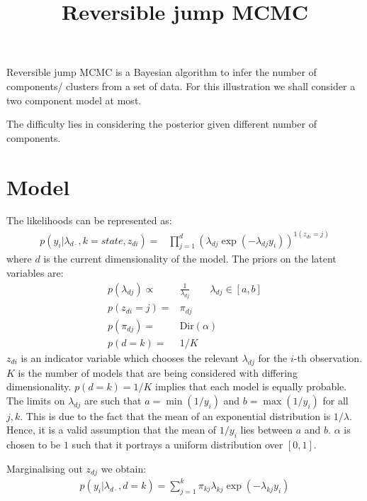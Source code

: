 \documentclass{article}
\title{Reversible jump MCMC}
\date{}
\begin{document}
\maketitle




Reversible jump MCMC is a Bayesian algorithm to infer the number of components/ clusters from a set of data. For this illustration we shall consider a two component model at most.

The difficulty lies in considering the posterior given different number of components.

\section{Model}
The likelihoods can be represented as:
\begin{align}
p(y_i|\lambda_{d\cdot},k=state,z_{di})=&\prod_{j=1}^{d} (\lambda_{dj}\exp(-\lambda_{dj}y_i))^{1(z_{di}=j)}
\end{align}
where $d$ is the current dimensionality of the model. The priors on the latent variables are:
\begin{align}
p(\lambda_{dj})\propto & \frac{1}{\lambda_{dj}}\qquad \lambda_{dj}\in[a,b]\\
p(z_{di}=j)=&\pi_{dj}\\
p(\pi_{dj}) = & \text{Dir}(\alpha)\\
p(d=k)= & 1/K
\end{align}
$z_{di}$ is an indicator variable which chooses the relevant $\lambda_{dj}$ for the $i$-th observation. $K$ is the number of models that are being considered with differing dimensionality. $p(d=k)= 1/K$ implies that each model is equally probable. The limits on $\lambda_{dj}$ are such that $a=\min(1/y_i)$ and $b=\max(1/y_i)$ for all $j,k$. This is due to the fact that the mean of an exponential distribution is $1/\lambda$. Hence, it is a valid assumption that the mean of $1/y_i$ lies between $a$ and $b$. $\alpha$ is chosen to be $1$ such that it portrays a uniform distribution over $[0,1]$.

Marginalising out $z_{dj}$ we obtain:
\begin{align}
p(y_i|\lambda_{d\cdot},d=k)= \sum_{j=1}^{k}\pi_{kj}\lambda_{kj}\exp(-\lambda_{kj}y_i)
\label{eq:lik}
\end{align}
\end{document}
